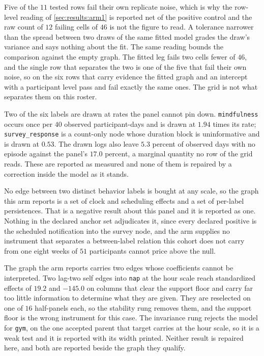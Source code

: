 Five of the $11$ tested rows fail their own replicate noise, which is why the
row-level reading of \cref{sec:results:arm1} is reported net of the positive
control and the raw count of $12$ failing cells of $46$ is not the figure to
read. A tolerance narrower than the spread between two draws of the same fitted
model grades the draw's variance and says nothing about the fit. The same
reading bounds the comparison against the empty graph. The fitted leg fails two
cells fewer of $46$, and the single row that separates the two is one of the
five that fail their own noise, so on the six rows that carry evidence the
fitted graph and an intercept with a participant level pass and fail exactly the
same ones. The grid is not what separates them on this roster.

Two of the six labels are drawn at rates the panel cannot pin down.
\texttt{mindfulness} occurs once per $40$ observed participant-days and is
drawn at $1.94$ times its rate; \texttt{survey\_response} is a count-only node
whose duration block is uninformative and is drawn at $0.53$. The drawn logs
also leave $5.3$ percent of observed days with no episode against the panel's
$17.0$ percent, a marginal quantity no row of the grid reads. These are
reported as measured and none of them is repaired by a correction inside the
model as it stands.

No edge between two distinct behavior labels is bought at any scale, so the
graph this arm reports is a set of clock and scheduling effects and a set of
per-label persistences. That is a negative result about this panel and it is
reported as one. Nothing in the declared anchor set adjudicates it, since every
declared positive is the scheduled notification into the survey node, and the
arm supplies no instrument that separates a between-label relation this cohort
does not carry from one eight weeks of $51$ participants cannot price above the
null.

The graph the arm reports carries two edges whose coefficients cannot be
interpreted. Two lag-two self edges into \texttt{nap} at the hour scale reach
standardized effects of $19.2$ and $-145.0$ on columns that clear the support
floor and carry far too little information to determine what they are given.
They are reselected on one of $16$ half-panels each, so the stability rung
removes them, and the support floor is the wrong instrument for this case. The
invariance rung rejects the model for \texttt{gym}, on the one accepted parent
that target carries at the hour scale, so it is a weak test and it is reported
with its width printed. Neither result is repaired here, and both are reported
beside the graph they qualify.

